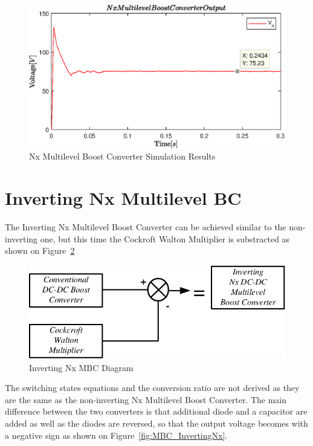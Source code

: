\begin{figure}[H]
   \centering
   \includegraphics[width=\textwidth]{figures/yMultilevel/Non-invertingNx.eps}
    \caption{Nx Multilevel Boost Converter Simulation Results}
	\label{fig:MBC_SimResults}
\end{figure}

\section{Inverting Nx Multilevel BC}\label{ch:IMBC}

The Inverting Nx Multilevel Boost Converter can be achieved similar to the non-inverting one, but this time the Cockroft Walton Multiplier is substracted as shown on Figure~\ref{fig:MBC_CW_CBCtoINx}

\begin{figure}[H]
   \centering
   \includegraphics[width=\textwidth]{figures/yMultilevel/InvertingNxDiagram.pdf}
    \caption{Inverting Nx MBC Diagram}
	\label{fig:MBC_CW_CBCtoINx}
\end{figure}

The switching states equations and the conversion ratio are not derived as they are the same as the non-inverting Nx Multilevel Boost Converter. The main difference between the two converters is that additional diode and a capacitor are added as well as the diodes are reversed, so that the output voltage becomes with a negative sign as shown on Figure~\ref{fig:MBC_InvertingNx}.

